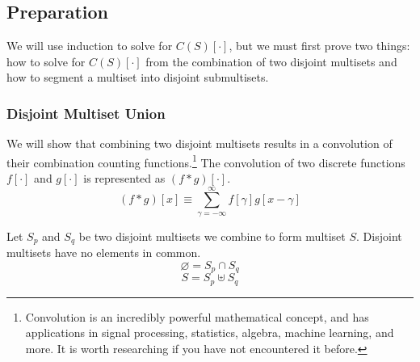 \documentclass{article}
\begin{document}
\subsection{Preparation}

 We will use induction to solve for $C(S)[\cdot]$, but we must first prove two things: how to solve for $C(S)[\cdot]$ from the combination of two disjoint multisets and how to segment a multiset into disjoint submultisets.



\subsubsection{Disjoint Multiset Union} \label{union}

We will show that combining two disjoint multisets results in a convolution of their combination counting functions.\footnote{Convolution is an incredibly powerful mathematical concept, and has applications in signal processing, statistics, algebra, machine learning, and more. It is worth researching if you have not encountered it before.} The convolution of two discrete functions $f[\cdot]$ and $g[\cdot]$ is represented as $(f * g)[\cdot]$.
\begin{equation}
     (f * g)[x] \equiv \sum_{\gamma=-\infty}^{\infty} f[\gamma]g[x - \gamma]
\end{equation}

Let $S_p$ and $S_q$ be two disjoint multisets we combine to form multiset $S$. Disjoint multisets have no elements in common. 
\begin{equation}
    \varnothing = S_p \cap S_q
\end{equation}
\begin{equation}
    S = S_p \uplus S_q
\end{equation}
\end{document}

